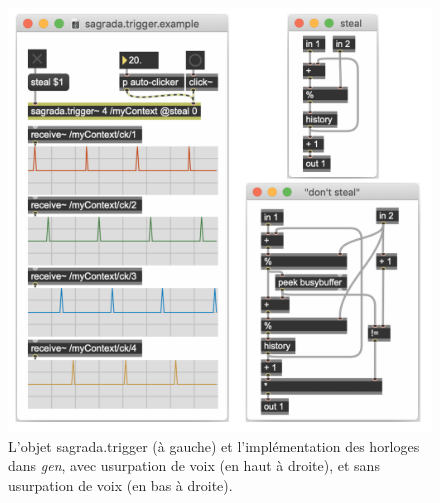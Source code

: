 \begin{figure}[!htbp]
	\centering
	\captionsetup{format=plain}
	\includegraphics[width=\textwidth]{gfx/04_algorithms/Sagrada-TriggerClock.png}
	\caption[Sagrada : horloge synchrone et assignation]{L'objet sagrada.trigger (à gauche) et l'implémentation des horloges dans \textit{gen}, avec usurpation de voix (en haut à droite), et sans usurpation de voix (en bas à droite).}
	\label{fig:algorithms:Sagrada-TriggerClock}
\end{figure}

